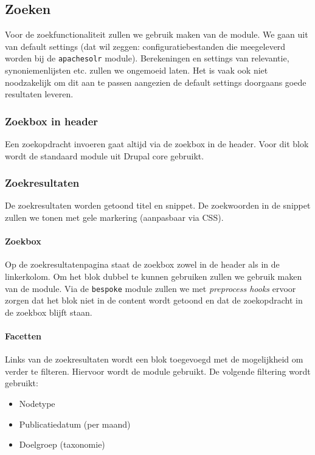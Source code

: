 \subsection{Zoeken}\label{zoeken}
Voor de zoekfunctionaliteit zullen we gebruik maken van de  module. We gaan uit van default settings (dat wil zeggen: configuratiebestanden die meegeleverd worden bij de \texttt{apachesolr} module). Berekeningen en settings van relevantie, synoniemenlijsten etc. zullen we ongemoeid laten. Het is vaak ook niet noodzakelijk om dit aan te passen aangezien de default settings doorgaans goede resultaten leveren.

\subsubsection{Zoekbox in header}
Een zoekopdracht invoeren gaat altijd via de zoekbox in de header. Voor dit blok wordt de standaard  module uit Drupal core gebruikt.

\subsubsection{Zoekresultaten}
De zoekresultaten worden getoond titel en snippet. De zoekwoorden in de snippet zullen we tonen met gele markering (aanpasbaar via CSS).

\paragraph{Zoekbox}
Op de zoekresultatenpagina staat de zoekbox zowel in de header als in de linkerkolom. Om het blok dubbel te kunnen gebruiken zullen we gebruik maken van de  module. Via de \texttt{bespoke} module zullen we met \emph{preprocess hooks} ervoor zorgen dat het blok niet in de content wordt getoond en dat de zoekopdracht in de zoekbox blijft staan.

\paragraph{Facetten}
Links van de zoekresultaten wordt een blok toegevoegd met de mogelijkheid om verder te filteren. Hiervoor wordt de  module gebruikt. De volgende filtering wordt gebruikt:
\begin{itemize}
\item Nodetype
\item Publicatiedatum (per maand)
\item Doelgroep (taxonomie)
\end{itemize}

